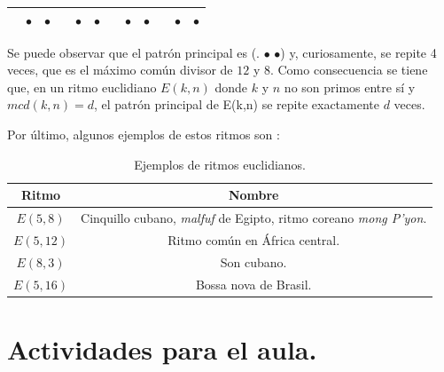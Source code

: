 \documentclass[a4paper, openright, 11pt, titlepage]{report}
\theoremstyle{definition}\newtheorem{defin}[propo]{Definition}
\theoremstyle{definition}\newtheorem{obser}[propo]{Remark}
\theoremstyle{definition}\newtheorem{ejem}[propo]{Ejemplo}
\theoremstyle{definition}\newtheorem{algoritmo}[propo]{Algoritmo}
\begin{document}
\begin{enumerate}
    \begin{table}[H]
        \centering
        \begin{tabular}{|c|c|c|c|c|c|c|c|c|c|c|c|}
        \hline
            & $\bullet$ & $\bullet$ & & $\bullet$ & $\bullet$ & & $\bullet$ & $\bullet$ & &$\bullet$ & $\bullet$\\
            \hline
        \end{tabular}
    \end{table}
    Se puede observar que el patrón principal es (\hspace{0.1cm}. \hspace{0.1cm} $\bullet$ \hspace{0.1cm} $\bullet$) y, curiosamente, se repite 4 veces, que es el máximo común divisor de $12$ y $8$. Como consecuencia se tiene que, en un ritmo euclidiano $E(k,n)$ donde $k$ y $n$ no son primos entre sí y $mcd(k,n) = d$, el patrón principal de E(k,n) se repite exactamente $d$ veces.
\end{enumerate}
Por último, algunos ejemplos de estos ritmos son \cite{ritmos}:
\begin{table}[H]
    \centering
    \begin{tabular}{|c|c|}
    \hline
      Ritmo   &  Nombre\\
      \hline \hline
      $E(5,8)$ & Cinquillo cubano, \textit{malfuf} de Egipto, ritmo coreano \textit{mong P'yon}.\\
      \hline
      $E(5,12)$ & Ritmo común en África central.\\
      \hline
      $E(8,3)$ & Son cubano.\\
      \hline
      $E(5, 16)$ & Bossa nova de Brasil.\\
      \hline
    \end{tabular}
    \caption{Ejemplos de ritmos euclidianos.}
\end{table}
\chapter{Actividades para el aula.}
\end{document}
